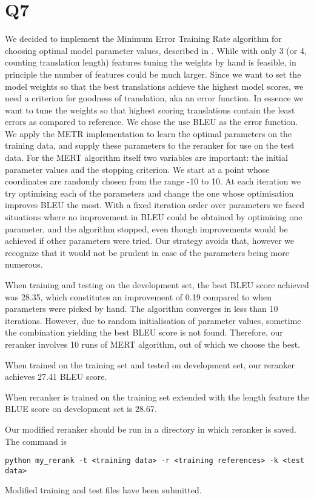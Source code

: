\section*{Q7}
We decided to implement the Minimum Error Training Rate algorithm for choosing optimal model parameter values, described in \cite{och2003}. While with only 3 (or 4, counting translation length) features tuning the weights by hand is feasible, in principle the number of features could be much larger. Since we want to set the model weights so that the best translations achieve the highest model scores, we need a criterion for goodness of translation, aka an error function. In essence we want to tune the weights so that highest scoring translations contain the least errors as compared to reference. We chose the use BLEU as the error function. We apply the METR implementation to learn the optimal parameters on the training data, and supply these parameters to the reranker for use on the test data.
For the MERT algorithm itself two variables are important: the initial parameter values and the stopping criterion. We start at a point whose coordinates are randomly chosen from the range -10 to 10. At each iteration we try optimising each of the parameters and change the one whose optimisation improves BLEU the most. With a fixed iteration order over parameters we faced situations where no improvement in BLEU could be obtained by optimising one parameter, and the algorithm stopped, even though improvements would be achieved if other parameters were tried. Our strategy avoids that, however we recognize that it would not be prudent in case of the parameters being more numerous.

When training and testing on the development set, the best BLEU score achieved was 28.35, which constitutes an improvement of 0.19 compared to when parameters were picked by hand. The algorithm converges in less than 10 iterations. However, due to random initialisation of parameter values, sometime the combination yielding the best BLEU score is not found. Therefore, our reranker involves 10 runs of MERT algorithm, out of which we choose the best.

When trained on the training set and tested on development set, our reranker achieves 27.41 BLEU score.

When reranker is trained on the training set extended with the length feature the BLUE score on development set is 28.67.

Our modified reranker should be run in a directory in which reranker is saved. The command is
\begin{lstlisting}
python my_rerank -t <training data> -r <training references> -k <test data>
\end{lstlisting}
Modified training and test files have been submitted.
